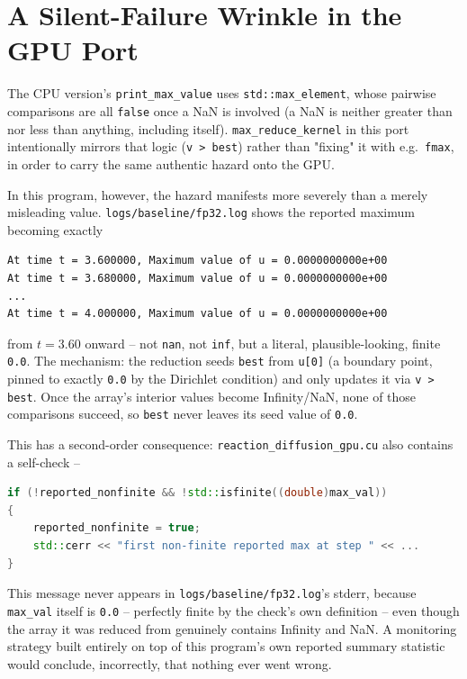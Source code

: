 \documentclass[11pt,a4paper]{article}
\begin{document}
\section{A Silent-Failure Wrinkle in the GPU Port}
\label{sec:silent-failure}

The CPU version's \texttt{print\_max\_value} uses \texttt{std::max\_element},
whose pairwise comparisons are all \texttt{false} once a NaN is involved (a
NaN is neither greater than nor less than anything, including itself).
\texttt{max\_reduce\_kernel} in this port intentionally mirrors that logic
(\texttt{v > best}) rather than "fixing" it with e.g.\ \texttt{fmax}, in
order to carry the same authentic hazard onto the GPU.

In this program, however, the hazard manifests more severely than a merely
misleading value. \texttt{logs/baseline/fp32.log} shows the reported
maximum becoming exactly

\begin{lstlisting}
At time t = 3.600000, Maximum value of u = 0.0000000000e+00
At time t = 3.680000, Maximum value of u = 0.0000000000e+00
...
At time t = 4.000000, Maximum value of u = 0.0000000000e+00
\end{lstlisting}

\noindent from $t=3.60$ onward -- not \texttt{nan}, not \texttt{inf}, but a
literal, plausible-looking, finite \texttt{0.0}. The mechanism: the
reduction seeds \texttt{best} from \texttt{u[0]} (a boundary point, pinned
to exactly \texttt{0.0} by the Dirichlet condition) and only updates it via
\texttt{v > best}. Once the array's interior values become
Infinity/NaN, none of those comparisons succeed, so \texttt{best} never
leaves its seed value of \texttt{0.0}.

This has a second-order consequence: \texttt{reaction\_diffusion\_gpu.cu}
also contains a self-check --

\begin{lstlisting}[language=C++]
if (!reported_nonfinite && !std::isfinite((double)max_val))
{
    reported_nonfinite = true;
    std::cerr << "first non-finite reported max at step " << ...
}
\end{lstlisting}

\noindent This message never appears in \texttt{logs/baseline/fp32.log}'s
stderr, because \texttt{max\_val} itself is \texttt{0.0} -- perfectly
finite by the check's own definition -- even though the array it was
reduced from genuinely contains Infinity and NaN. A monitoring strategy
built entirely on top of this program's own reported summary statistic
would conclude, incorrectly, that nothing ever went wrong.
\end{document}
